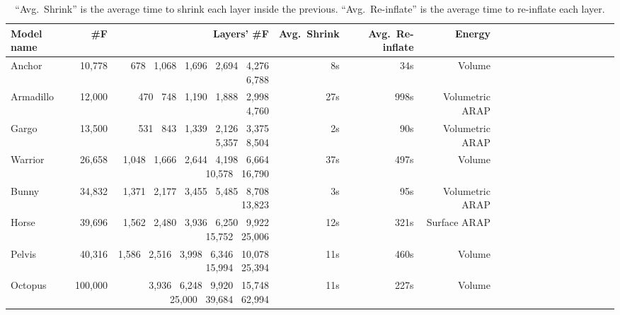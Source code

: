 \begin{table*}
\centering
{}
\setlength{\tabcolsep}{5.5pt}
\begin{tabular}{l r r r r r r r r r r r r r r r r r}
\rowcolor{white}
Model name  & \#F & Layers' \#F & Avg.\ Shrink & Avg.\ Re-inflate& Energy\\
\midrule
Anchor & 10,778 & 678 \ 1,068 \ 1,696 \ 2,694 \ 4,276 \ 6,788 & 8s & 34s & Volume \\
Armadillo & 12,000 & 470 \ 748 \ 1,190 \ 1,888 \ 2,998 \ 4,760 & 27s & 998s & Volumetric ARAP \\
Gargo & 13,500 & 531 \ 843 \ 1,339 \ 2,126 \ 3,375 \ 5,357 \ 8,504 & 2s & 90s & Volumetric ARAP\\
Warrior & 26,658 & 1,048 \ 1,666 \ 2,644 \ 4,198 \ 6,664 \ 10,578 \ 16,790 & 37s & 497s & Volume  \\
Bunny & 34,832 & 1,371 \ 2,177 \ 3,455 \ 5,485 \ 8,708 \ 13,823 & 3s & 95s & Volumetric ARAP \\
Horse & 39,696 & 1,562 \ 2,480 \ 3,936 \ 6,250 \ 9,922 \ 15,752 \ 25,006 & 12s & 321s & Surface ARAP \\
Pelvis & 40,316 & 1,586 \ 2,516 \ 3,998 \ 6,346 \ 10,078 \ 15,994 \ 25,394 & 11s & 460s & Volume  \\
Octopus & 100,000 & 3,936 \ 6,248 \ 9,920 \ 15,748 \ 25,000 \ 39,684 \ 62,994 & 11s & 227s & Volume \\
\bottomrule
\end{tabular}
\caption{
``Avg.\ Shrink'' is the average time to shrink each layer inside the previous.
``Avg.\ Re-inflate'' is the average time to re-inflate each layer.
}
\label{tab:timings}
\end{table*}
